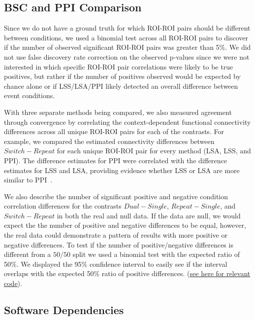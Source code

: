 \documentclass[phd,figures,tables,ackpage,abstractpage,publicabstractpage]{uithesis}
\begin{document}
\subsection{BSC and PPI Comparison}

Since we do not have a ground truth for which ROI-ROI pairs should be different between conditions,
we used a binomial test across all ROI-ROI pairs to discover if the number of observed significant ROI-ROI pairs was greater
than 5\%.
We did not use false discovery rate correction on the observed p-values since we were not interested in
which specific ROI-ROI pair correlations were likely to be true positives, but rather if the number of positives
observed would be expected by chance alone or if LSS/LSA/PPI likely detected an overall difference between event conditions.

With three separate methods being compared, we also measured agreement through convergence by correlating the
context-dependent functional connectivity differences across all unique ROI-ROI pairs for each of the contrasts.
For example, we compared the estimated connectivity differences between $Switch - Repeat$ for each unique
ROI-ROI pair for every method (LSA, LSS, and PPI).
The difference estimates for PPI were correlated with the difference estimates for LSS and LSA, providing
evidence whether LSS or LSA are more similar to PPI~\cite{Steiger1980}.

We also describe the number of significant positive and negative condition correlation differences
for the contrasts $Dual - Single$, $Repeat - Single$, and $Switch - Repeat$
in both the real and null data.
If the data are null, we would expect the the number of positive and negative
differences to be equal, however, the real data could demonstrate a pattern
of results with more positive or negative differences.
To test if the number of positive/negative differences is different from a $50/50$
split we used a binomial test with the expected ratio of 50\%.
We displayed the 95\% confidence interval to easily see if the interval
overlaps with the expected 50\% ratio of positive differences.
(\href{https://github.com/jdkent/BetaSeriesRealDataAnalysis/blob/2e5d7d2443795133770383daaa401cf70cc03f29/PPITest/compare_bsc_ppi.ipynb}{see here for relevant code}).

\subsection{Software Dependencies}
\label{methods:software-dependencies2}
\end{document}
